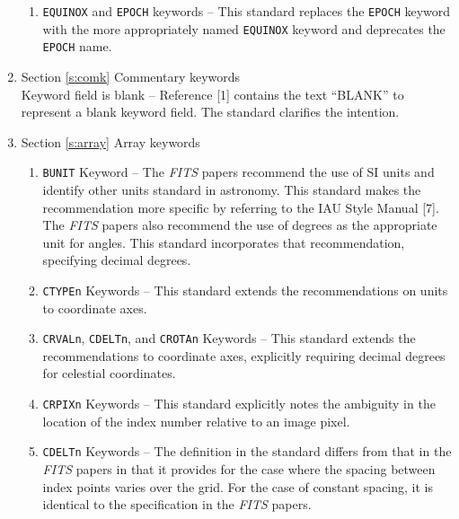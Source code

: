 \begin{enumerate}
\begin{enumerate}
 \item {\tt EQUINOX} and {\tt EPOCH} keywords -- This
     standard replaces the
     {\tt EPOCH} keyword with the more appropriately 
     named {\tt EQUINOX} keyword and 
     deprecates the {\tt EPOCH} name.     

 \end{enumerate}

\item Section \ref{s:comk} Commentary keywords\\
     Keyword field is blank -- Reference [1] contains 
     the text ``BLANK'' to represent a blank keyword field.  The standard
     clarifies the intention.

\item Section \ref{s:array} Array keywords

 \begin{enumerate}

 \item {\tt BUNIT} Keyword -- The {\em FITS\/} papers 
     recommend the use of SI units and 
     identify other units standard in astronomy.  This 
     standard makes the recommendation more
     specific by referring to the IAU Style Manual [7].
     The {\em FITS} papers also recommend
     the use of degrees as the appropriate unit for 
     angles. This standard 
     incorporates that recommendation, specifying decimal degrees.

 \item {\tt CTYPEn} Keywords -- This standard extends the
     recommendations on units to
     coordinate axes.

 \item {\tt CRVALn}, {\tt CDELTn}, and {\tt CROTAn} 
     Keywords -- This 
     standard extends the recommendations to coordinate
     axes, explicitly requiring decimal degrees for 
     celestial coordinates.

 \item {\tt CRPIXn} Keywords -- This standard explicitly notes the 
     ambiguity
     in the location of the index number relative to an image pixel.

 \item {\tt CDELTn} Keywords -- The definition in the standard 
     differs from that in the {\em FITS\/} papers in that 
     it provides for the case where
     the spacing between index points varies over the grid.  
     For the case of constant spacing, it is identical to 
     the specification in the {\em FITS\/} papers.


\end{enumerate}
\end{enumerate}
